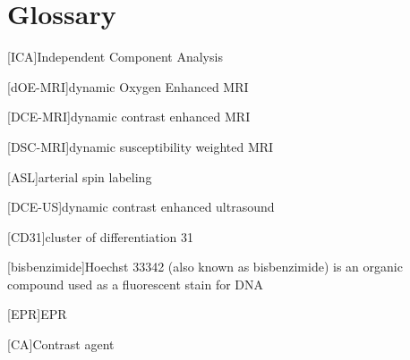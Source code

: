 
\chapter{Glossary}




\begin{acronym}

[ICA]{Independent Component Analysis}%

[dOE-MRI]{dynamic Oxygen Enhanced MRI}%

[DCE-MRI]{dynamic contrast enhanced MRI}

[DSC-MRI]{dynamic susceptibility weighted MRI}

[ASL]{arterial spin labeling}

[DCE-US]{dynamic contrast enhanced ultrasound}%

[CD31]{cluster of differentiation 31}%

[bisbenzimide]{Hoechst 33342 (also known as bisbenzimide) is an organic compound used as a fluorescent stain for DNA}

[EPR]{EPR}%

[CA]{Contrast agent}


\end{acronym}
